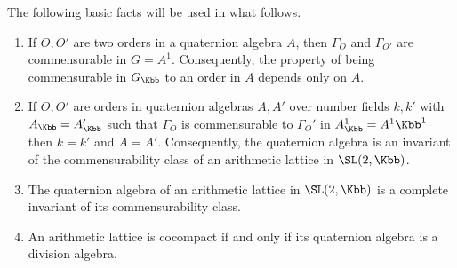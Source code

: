 The following basic facts will be used in what follows.
\begin{proposition}
    \begin{enumerate}
        Let $\Kbb = \Rbb$ or $\Cbb$.
        \item\label{item:orders} If $O,O'$ are two orders in a quaternion algebra $A$, then $\Gamma_O$ and $\Gamma_{O'}$ are commensurable in $G=A^1$. Consequently, the property of being commensurable in $G_\Kbb$ to an order in $A$ depends only on $A$.
        \item If $O,O'$ are orders in quaternion algebras $A,A'$ over number fields $k,k'$ with $A_\Kbb = A'_\Kbb$ such that $\Gamma_O$ is commensurable to $\Gamma_O'$ in $A_\Kbb^1 = {A^1}{\Kbb}^1$ then $k=k'$ and $A = A'$. Consequently, the quaternion algebra is an invariant of the commensurability class of an arithmetic lattice in $\SL(2,\Kbb)$.
        \item The quaternion algebra of an arithmetic lattice in $\SL(2,\Kbb)$ is a complete invariant of its commensurability class.
        \item An arithmetic lattice is cocompact if and only if its quaternion algebra is a division algebra.
    \end{enumerate}
\end{proposition}



\newpage